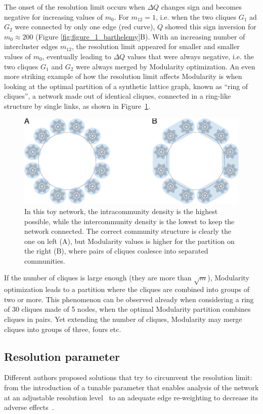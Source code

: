The onset of the resolution limit occurs when $\Delta Q$ changes sign and becomes negative for increasing values of $m_0$.
For $m_{12}=1$, i.e. when the two cliques $G_1$ ad $G_2$ were connected by only one edge (red curve), $Q$ showed this sign inversion for $m_0 \approx 200$ (Figure \ref{fig:figure_1_barthelemy}B).
With an increasing number of intercluster edges $m_{12}$, the resolution limit appeared for smaller and smaller values of $m_0$, eventually leading to $\Delta Q$ values that were always negative, i.e. the two cliques $G_1$ and $G_2$ were always merged by Modularity optimization.
An even more striking example of how the resolution limit affects Modularity is when looking at the optimal partition of a synthetic lattice graph, known as ``ring of cliques'', a network made out of identical cliques, connected in a ring-like structure by single links, as shown in Figure~\ref{fig:traag_ring_of_cliques}. 

\begin{figure}[htb!]
\centering
\includegraphics[width=1\textwidth]{images/traag_ring_of_cliques.pdf}
\caption{In this toy network, the intracommunity density is the highest possible, while the intercommunity density is the lowest to keep the network connected. The correct community structure is clearly the one on left (A), but Modularity values is higher for the partition on the right (B), where pairs of cliques coalesce into separated communities.}
\label{fig:traag_ring_of_cliques}
\end{figure}
If the number of cliques is large enough (they are more than $\sqrt{m}$), Modularity optimization leads to a partition where the cliques are combined into groups of two or more. This phenomenon can be observed already when considering a ring of 30 cliques made of 5 nodes, when the optimal Modularity partition combines cliques in pairs.
Yet extending the number of cliques, Modularity may merge cliques into groups of three, fours etc.

\subsection{Resolution parameter}
Different authors proposed solutions that try to circumvent the resolution limit: from the introduction of a tunable parameter that enables analysis of the network at an adjustable resolution level~\cite{reichardt2006,ronhovde2010,yeo2011} to an adequate edge re-weighting to decrease its adverse effects~\cite{berry2011}.

